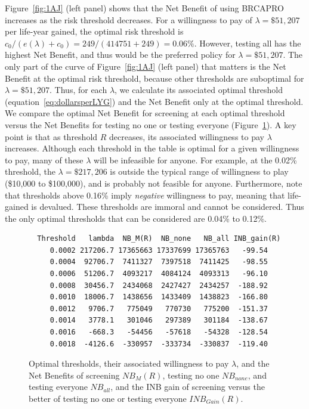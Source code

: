 \documentclass[AMA,STIX1COL]{WileyNJD-v2}
\begin{document}
Figure~\ref{fig:1AJ} (left panel)  shows that the Net Benefit of using BRCAPRO increases as the risk threshold decreases.  For a willingness to pay of $\lambda=\$51,207$ per life-year gained, the optimal risk threshold is $c_0/(e(\lambda)+c_0) = 249/(414751+249)=0.06\%$.  However, testing all has the highest Net Benefit, and thus would be the preferred policy for $\lambda=\$51,207$.  The only part of the curve of Figure~\ref{fig:1AJ} (left panel) that matters is the Net Benefit at the optimal risk threshold, because other thresholds are suboptimal for $\lambda=\$51,207$.  Thus, for each $\lambda$, we calculate its associated optimal threshold (equation~\ref{eq:dollarsperLYG}) and the Net Benefit only at the optimal threshold.  We compare the optimal Net Benefit for screening at each optimal threshold versus the Net Benefits for testing no one or testing everyone  (Figure~\ref{tab:NBforAJ}).  A key point is that as threshold $R$ decreases, its associated willingness to pay $\lambda$ increases.  Although each threshold in the table is optimal for a given willingness to pay, many of these $\lambda$ will be infeasible for anyone.  For example, at the 0.02\% threshold, the $\lambda=\$217,206$ is outside the typical range of willingness to play (\$10,000 to \$100,000), and is probably not feasible for anyone.  Furthermore, note that thresholds above 0.16\% imply \textit{negative} willingness to pay, meaning that life-gained is devalued.  These thresholds are immoral and cannot be considered.  Thus the only optimal thresholds that can be considered are 0.04\% to 0.12\%.

\begin{figure}[t!]
	\centering
	\begin{verbatim}
  Threshold   lambda  NB_M(R)  NB_none   NB_all INB_gain(R)
     0.0002 217206.7 17365663 17337699 17365763   -99.54
     0.0004  92706.7  7411327  7397518  7411425   -98.55
     0.0006  51206.7  4093217  4084124  4093313   -96.10
     0.0008  30456.7  2434068  2427427  2434257  -188.92
     0.0010  18006.7  1438656  1433409  1438823  -166.80
     0.0012   9706.7   775049   770730   775200  -151.37
     0.0014   3778.1   301046   297389   301184  -138.67
     0.0016   -668.3   -54456   -57618   -54328  -128.54
     0.0018  -4126.6  -330957  -333734  -330837  -119.40
	\end{verbatim}
	\caption{Optimal thresholds, their associated willingness to pay $\lambda$, and the Net Benefits of screening $N\!B_M(R)$,  testing no one $N\!B_{none}$, and testing everyone $N\!B_{all}$, and the INB gain of screening versus the better of testing no one or testing everyone $I\!N\!B_{Gain}(R)$.}
	\label{tab:NBforAJ}
\end{figure}
\end{document}
